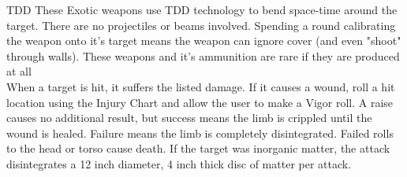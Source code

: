 \begin{multicols}{2}
\begin{genericsection}{TDD}
These Exotic weapons use TDD technology to bend space-time around the target. There are no projectiles or beams involved. Spending a round calibrating the weapon onto it's target means the weapon can ignore cover (and even "shoot" through walls). These weapons and it's ammunition are rare if they are produced at all\\
When a target is hit, it suffers the listed damage. If it causes a wound, roll a hit location using the Injury Chart and allow the user to make a Vigor roll. A raise causes no additional result, but success means the limb is crippled until the wound is healed. Failure means the limb is completely disintegrated. Failed rolls to the head or torso cause death. If the target was inorganic matter, the attack disintegrates a 12 inch diameter, 4 inch thick disc of matter per attack.
\end{genericsection}

\end{multicols}

